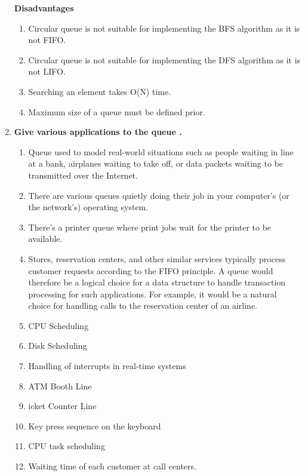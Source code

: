 \documentclass[11pt]{article}
\begin{document}
\begin{enumerate}
	      \textbf{Disadvantages}

	      \begin{enumerate}
		      \item Circular queue is not suitable for implementing the BFS algorithm as it is not FIFO.
		      \item Circular queue is not suitable for implementing the DFS algorithm as it is not LIFO.
		      \item Searching an element takes O(N) time.
		      \item Maximum size of a queue must be defined prior.
	      \end{enumerate}

	\item \textbf{Give various applications to the queue .}\\
	      \begin{enumerate}
		      \item Queue used to model real-world situations such as people waiting in line at a bank, airplanes
		            waiting to take off, or data packets waiting to be transmitted over the Internet.
		      \item There are various queues quietly doing their job in your computer's (or the network's) operating
		            system.
		      \item There's a printer queue where print jobs wait for the printer to be available.
		      \item Stores, reservation centers, and other similar services typically process customer requests
		            according to the FIFO principle. A queue would therefore be a logical choice for a data structure to
		            handle transaction processing for such applications. For example, it would be a natural choice for
		            handling calls to the reservation center of an airline.
		      \item CPU Scheduling
		      \item Disk Scheduling
		      \item Handling of interrupts in real-time systems
		      \item ATM Booth Line
		      \item icket Counter Line
		      \item Key press sequence on the keyboard
		      \item CPU task scheduling
		      \item Waiting time of each customer at call centers.
	      \end{enumerate}


\end{enumerate}
\end{document}
